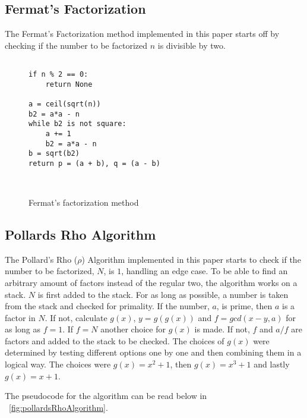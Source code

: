 \subsection{Fermat's Factorization}

The Fermat's Factorization method implemented in this paper starts off by checking if the number to be factorized $n$ is divisible by two.

 \begin{figure}[H]
    \centering
    \begin{minipage}{0.5\textwidth}
        \begin{verbatim}

if n % 2 == 0:
    return None
    
a = ceil(sqrt(n))
b2 = a*a - n
while b2 is not square:
    a += 1
    b2 = a*a - n
b = sqrt(b2)
return p = (a + b), q = (a - b)
        
        
            \end{verbatim}
    \end{minipage}
    \caption{Fermat's factorization method}
    \label{fig:FermatsFactorization}      
 \end{figure}
\subsection{Pollards Rho Algorithm}

The Pollard's Rho ($\rho$) Algorithm implemented in this paper starts to check if the number to be factorized, $N$, is $1$, handling an edge case. To be able to find an arbitrary amount of factors instead of the regular two, the algorithm works on a stack. $N$ is first added to the stack. For as long as possible, a number is taken from the stack and checked for primality. If the number, $a$, is prime, then $a$ is a factor in $N$. If not, calculate $g(x)$, $y=g(g(x))$ and $f=gcd(x - y, a)$ for as long as $f=1$. If $f=N$ another choice for $g(x)$ is made. If not, $f$ and $a/f$ are factors and added to the stack to be checked. The choices of $g(x)$ were determined by testing different options one by one and then combining them in a logical way. The choices were $g(x)=x^2+1$, then $g(x)=x^3+1$ and lastly $g(x)=x+1$.

The pseudocode for the algorithm can be read below in ~\ref{fig:pollardsRhoAlgorithm}.
 
